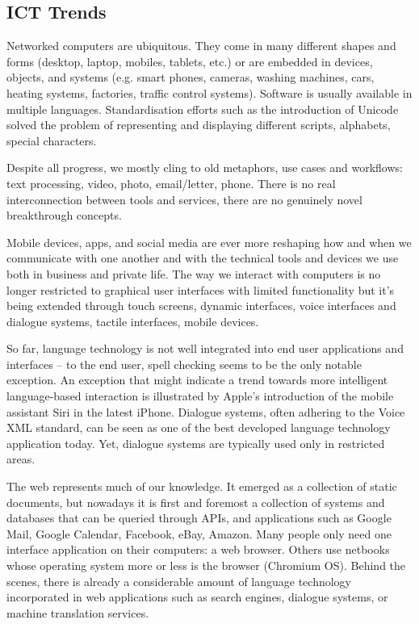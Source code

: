 \begin{multicols}{2}

\subsection{ICT Trends}
\label{sec:ict-trends}

Networked computers are ubiquitous. They come in many different shapes and forms (desktop, laptop, mobiles, tablets, etc.) or are embedded in devices, objects, and systems (e.g. smart phones, cameras, washing machines, cars, heating systems, factories, traffic control systems). Software is usually available in multiple languages. Standardisation efforts such as the introduction of Unicode solved the problem of representing and displaying different scripts, alphabets, special characters. 

Despite all progress, we mostly cling to old metaphors, use cases and workflows: text processing, video, photo, email/letter, phone. There is no real interconnection between tools and services, there are no genuinely novel breakthrough concepts.

Mobile devices, apps, and social media are ever more reshaping how and when we communicate with one another and with the technical tools and devices we use both in business and private life. The way we interact with computers is no longer restricted to graphical user interfaces with limited functionality but it’s being extended through touch screens, dynamic interfaces, voice interfaces and dialogue systems, tactile interfaces, mobile devices. 

So far, language technology is not well integrated into end user applications and interfaces -- to the end user, spell checking seems to be the only notable exception. An exception that might indicate a trend towards more intelligent language-based interaction is illustrated by Apple’s introduction of the mobile assistant Siri in the latest iPhone. Dialogue systems, often adhering to the Voice XML standard, can be seen as one of the best developed language technology application today. Yet, dialogue systems are typically used only in restricted areas.

The web represents much of our knowledge. It emerged as a collection of static documents, but nowadays it is first and foremost a collection of systems and databases that can be queried through APIs, and applications such as Google Mail, Google Calendar, Facebook, eBay, Amazon. Many people only need one interface application on their computers: a web browser. Others use netbooks whose operating system more or less is the browser (Chromium OS). Behind the scenes, there is already a considerable amount of language technology incorporated in web applications such as search engines, dialogue systems, or machine translation services.


\end{multicols}
